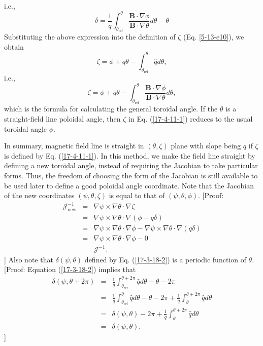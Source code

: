 \documentclass{article}
\newcommand{\tmop}[1]{\ensuremath{\operatorname{#1}}}
\begin{document}
i.e.,
\begin{equation}
  \delta = \frac{1}{q} \int_{\theta_{\tmop{ref}}}^{\theta} \frac{\mathbf{B}
  \cdot \nabla \phi}{\mathbf{B} \cdot \nabla \theta} d \theta - \theta
\end{equation}
Substituting the above expression into the definition of $\zeta$ (Eq.
\ref{5-13-e10}), we obtain
\begin{equation}
  \zeta = \phi + q \theta - \int_{\theta_{\tmop{ref}}}^{\theta} \hat{q} d
  \theta,
\end{equation}
i.e.,
\begin{equation}
  \label{17-4-11-1} \zeta = \phi + q \theta -
  \int_{\theta_{\tmop{ref}}}^{\theta} \frac{\mathbf{B} \cdot \nabla
  \phi}{\mathbf{B} \cdot \nabla \theta} d \theta,
\end{equation}
which is the formula for calculating the general toroidal angle. If the
$\theta$ is a straight-field line poloidal angle, then $\zeta$ in Eq.
(\ref{17-4-11-1}) reduces to the usual toroidal angle $\phi$.

In summary, magnetic field line is straight in $(\theta, \zeta)$ plane with
slope being $q$ if $\zeta$ is defined by Eq. (\ref{17-4-11-1}). In this
method, we make the field line straight by defining a new toroidal angle,
instead of requiring the Jacobian to take particular forms. Thus, the freedom
of choosing the form of the Jacobian is still available to be used later to
define a good poloidal angle coordinate. Note that the Jacobian of the new
coordinates $(\psi, \theta, \zeta)$ is equal to that of $(\psi, \theta,
\phi)$. [Proof:
\begin{eqnarray*}
  \mathcal{J}_{\tmop{new}}^{- 1} & = & \nabla \psi \times \nabla \theta \cdot
  \nabla \zeta\\
  & = & \nabla \psi \times \nabla \theta \cdot \nabla (\phi - q \delta)\\
  & = & \nabla \psi \times \nabla \theta \cdot \nabla \phi - \nabla \psi
  \times \nabla \theta \cdot \nabla (q \delta)\\
  & = & \nabla \psi \times \nabla \theta \cdot \nabla \phi - 0\\
  & = & \mathcal{J}^{- 1} .
\end{eqnarray*}
] Also note that $\delta (\psi, \theta)$ defined by Eq. (\ref{17-3-18-2}) is a
periodic function of $\theta$. [Proof: Equation (\ref{17-3-18-2}) implies that
\begin{eqnarray}
  \delta (\psi, \theta + 2 \pi) & = & \frac{1}{q}
  \int_{\theta_{\tmop{ref}}}^{\theta + 2 \pi} \hat{q} d \theta - \theta - 2
  \pi \nonumber\\
  & = & \frac{1}{q} \int_{\theta_{\tmop{ref}}}^{\theta} \hat{q} d \theta -
  \theta - 2 \pi + \frac{1}{q} \int_{\theta}^{\theta + 2 \pi} \hat{q} d \theta
  \nonumber\\
  & = & \delta (\psi, \theta) - 2 \pi + \frac{1}{q} \int_{\theta}^{\theta + 2
  \pi} \hat{q} d \theta \nonumber\\
  & = & \delta (\psi, \theta) . 
\end{eqnarray}
]
\end{document}
